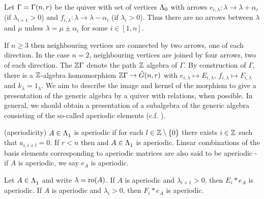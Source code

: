 \documentclass[a4paper, 11pt]{report}
\begin{document}
Let $\Gamma =\Gamma(n,r)$ be the quiver with set of vertices ${\Lambda_0}$ with arrows $e_{i,\lambda}\colon\lambda\to\lambda +\alpha_i$ (if $\lambda_{i+1}>0$) and $f_{i,\lambda}\colon\lambda\to\lambda -\alpha_i$ (if $\lambda_i>0$). Thus there are no arrows between $\lambda$ and $\mu$ unless $\lambda = \mu\pm \alpha_i$ for some $i\in [1,n]$.

If $n\geq 3$ then neighbouring vertices are connected by two arrows, one of each direction. In the case $n=2$, neighbouring vertices are joined by four arrows, two of each direction. The $\mathbb{Z}\Gamma$ denote the path $\mathbb{Z}$ algebra of $\Gamma$. By construction of $\Gamma$, there is a $\mathbb{Z}$-algebra homomorphism $\mathbb{Z}\Gamma\to\hat{G}(n,r)$ with $e_{i,\lambda}\mapsto E_{i,\lambda}$, $f_{i,\lambda}\mapsto F_{i,\lambda}$ and $k_\lambda = 1_\lambda$. We aim to describe the image and kernel of the morphism to give a presentation of the generic algebra by a quiver with relations, when possible. In general, we should obtain a presentation of a subalgebra of the generic algebra consisting of the so-called aperiodic elements (c.f. \cite{lusztig99}).

\begin{definition}(aperiodicity)\label{def:aperiodic}
$A\in\Lambda_1^{}$ is aperiodic if for each $l\in\mathbb{Z}\setminus\{0\}$ there exists $i\in\mathbb{Z}$ such that $a_{i,i+l}=0$. If $r<n$ then and $A\in\Lambda_1^{}$ is aperiodic. Linear combinations of the basis elements corresponding to aperiodic matrices are also said to be aperiodic - if $A$ is aperiodic, we say $e_A$ is aperiodic.
\end{definition}

\begin{lemma}\label{lemma:words-are-aperiodic}
Let $A\in\Lambda_1^{}$ and write $\lambda=\operatorname{ro}(A)$. If $A$ is aperiodic and $\lambda_{i+1}>0$, then $E_i\ast e_A$ is aperiodic. If $A$ is aperiodic and $\lambda_i>0$, then $F_i\ast e_A$ is aperiodic.
\end{lemma}
\end{document}
